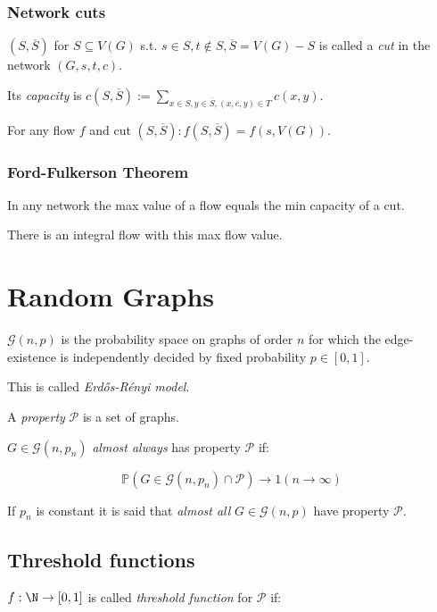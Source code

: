 \subsubsection*{Network cuts}

$(S,\overline S)$ for $S \subseteq V(G)$ s.t. $s \in S, t \notin S, \overline S = V(G)-S$ is called a \emph{cut} in the network $(G,s,t,c)$.

\spacing

Its \emph{capacity} is $c(S,\overline S) := \displaystyle\sum_{x \in S, y \in \overline S, (x,e,y) \in T} c(x,y)$.

\spacing

For any flow $f$ and cut $(S,\overline S) : f(S,\overline S) = f(s,V(G))$.

\subsubsection*{Ford-Fulkerson Theorem}

In any network the max value of a flow equals the min capacity of a cut.

There is an integral flow with this max flow value.

\section*{Random Graphs}

$\mathcal{G}(n,p)$ is the probability space on graphs of order $n$ for which the edge-existence is independently decided by fixed probability $p \in [0,1]$.

This is called \emph{Erd\H{o}s-R\'{e}nyi model}.

\spacing

A \emph{property} $\mathcal{P}$ is a set of graphs.

$G \in \mathcal{G}(n,p_n)$ \emph{almost always} has property $\mathcal{P}$ if:

$$\mathbb{P}(G \in \mathcal{G}(n,p_n) \cap \mathcal{P}) \to 1 (n \to \infty)$$

If $p_n$ is constant it is said that \emph{almost all} $G \in \mathcal{G}(n,p)$ have property $\mathcal{P}$.

\subsection*{Threshold functions}

$f : \N \to [0,1]$ is called \emph{threshold function} for $\mathcal{P}$ if:

